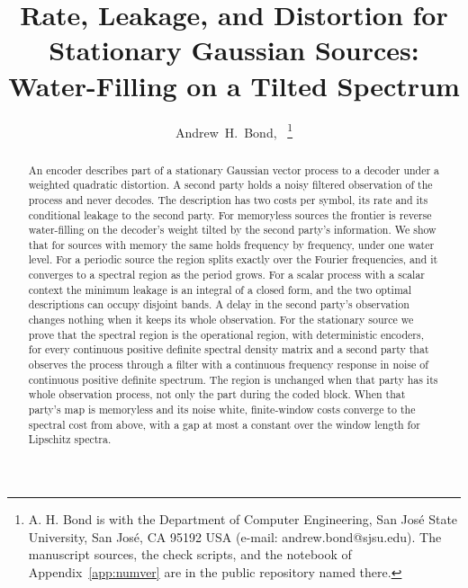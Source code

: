\documentclass[11pt,onecolumn]{IEEEtran}
\begin{document}
\title{Rate, Leakage, and Distortion for Stationary Gaussian Sources:\\ Water-Filling on a Tilted Spectrum}

\author{Andrew~H.~Bond,~%
\thanks{A. H. Bond is with the Department of Computer Engineering, San Jos\'e
State University, San Jos\'e, CA 95192 USA (e-mail: andrew.bond@sjsu.edu).
The manuscript sources, the check scripts, and the notebook of
Appendix~\ref{app:numver} are in the public repository named there.}}


\maketitle

\begin{abstract}
An encoder describes part of a stationary Gaussian vector process to a
decoder under a weighted quadratic distortion. A second party holds a
noisy filtered observation of the process and never decodes. The
description has two costs per symbol, its rate and its conditional
leakage to the second party. For memoryless sources the frontier is
reverse water-filling on the decoder's weight tilted by the second
party's information. We show that for sources with memory the same
holds frequency by frequency, under one water level. For a periodic
source the region splits exactly over the Fourier frequencies, and it
converges to a spectral region as the period grows. For a scalar process with a scalar
context the minimum leakage is an integral of a closed form, and the
two optimal descriptions can occupy disjoint bands. A delay
in the second party's observation changes nothing when it keeps its
whole observation. For the stationary source we prove that
the spectral region is the operational region, with deterministic
encoders, for every continuous positive definite spectral density
matrix and a second party that observes the process through a filter
with a continuous frequency response in noise of continuous positive
definite spectrum. The region is unchanged when that party has
its whole observation process, not only the part during the coded
block.
When that party's map is memoryless and its noise white,
finite-window costs converge to the spectral cost from above, with a
gap at most a constant over the window length for Lipschitz spectra.
\end{abstract}
\end{document}
